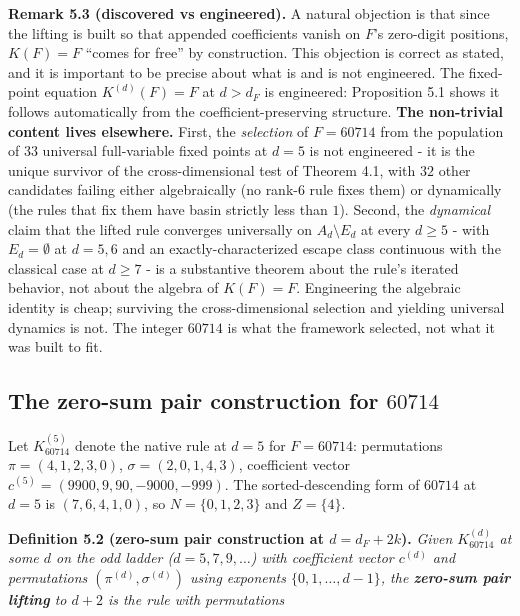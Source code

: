 \documentclass[11pt,letterpaper]{article}
\theoremstyle{paperstyle}
\theoremstyle{paperstyledef}
\theoremstyle{paperstylerem}
\begin{document}
\textbf{Remark 5.3 (discovered vs engineered).} A natural objection is
that since the lifting is built so that appended coefficients vanish on
\(F\)'s zero-digit positions, \(K(F) = F\) ``comes for free'' by
construction. This objection is correct as stated, and it is important
to be precise about what is and is not engineered. The fixed-point
equation \(K^{(d)}(F) = F\) at \(d > d_F\) is engineered: Proposition
5.1 shows it follows automatically from the coefficient-preserving
structure. \textbf{The non-trivial content lives elsewhere.} First, the
\emph{selection} of \(F = 60714\) from the population of \(33\)
universal full-variable fixed points at \(d = 5\) is not engineered -
it is the unique survivor of the cross-dimensional test of Theorem 4.1,
with \(32\) other candidates failing either algebraically (no rank-\(6\)
rule fixes them) or dynamically (the rules that fix them have basin
strictly less than \(1\)). Second, the \emph{dynamical} claim that the
lifted rule converges universally on \(A_d \setminus E_d\) at every
\(d \geq 5\) - with \(E_d = \emptyset\) at \(d = 5, 6\) and an
exactly-characterized escape class continuous with the classical case at
\(d \geq 7\) - is a substantive theorem about the rule's iterated
behavior, not about the algebra of \(K(F) = F\). Engineering the
algebraic identity is cheap; surviving the cross-dimensional selection
and yielding universal dynamics is not. The integer \(60714\) is what
the framework selected, not what it was built to fit.

\hypertarget{the-zero-sum-pair-construction-for-60714}{%
\subsection{\texorpdfstring{The zero-sum pair construction for \(60714\)}{The zero-sum pair construction for 60714}}\label{the-zero-sum-pair-construction-for-60714}}

Let \(K_{60714}^{(5)}\) denote the native rule at \(d = 5\) for
\(F = 60714\): permutations \(\pi = (4, 1, 2, 3, 0)\),
\(\sigma = (2, 0, 1, 4, 3)\), coefficient vector
\(c^{(5)} = (9900, 9, 90, -9000, -999)\). The sorted-descending form of
\(60714\) at \(d = 5\) is \((7, 6, 4, 1, 0)\), so \(N = \{0, 1, 2, 3\}\)
and \(Z = \{4\}\).

\textbf{Definition 5.2 (zero-sum pair construction at
\(d = d_F + 2k\)).} \emph{Given \(K_{60714}^{(d)}\) at some \(d\) on the
odd ladder (\(d = 5, 7, 9, \ldots\)) with coefficient vector \(c^{(d)}\)
and permutations \((\pi^{(d)}, \sigma^{(d)})\) using exponents
\(\{0, 1, \ldots, d-1\}\), the \textbf{zero-sum pair lifting} to
\(d + 2\) is the rule with permutations}
\end{document}

